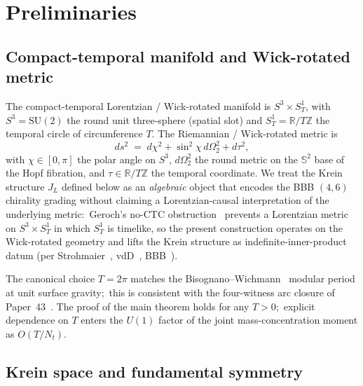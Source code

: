 \documentclass[11pt,a4paper]{article}
\theoremstyle{plain}
\theoremstyle{definition}
\newcommand{\Nt}{N_{t}}
\newcommand{\sthree}{S^{3}}
\newcommand{\SoneT}{S^{1}_{T}}
\newcommand{\Manifold}{S^{3}\times S^{1}_{T}}
\newcommand{\R}{\mathbb{R}}
\newcommand{\Z}{\mathbb{Z}}
\newcommand{\SU}{\mathrm{SU}}
\newcommand{\Uone}{U(1)}
\newcommand{\JL}{J_{L}}
\begin{document}
\section{Preliminaries}\label{sec:preliminaries}

\subsection{Compact-temporal manifold and Wick-rotated metric}
\label{sec:manifold}

The compact-temporal Lorentzian / Wick-rotated manifold is
$\Manifold$, with $\sthree = \SU(2)$ the round unit three-sphere
(spatial slot) and $\SoneT = \R / T\Z$ the temporal circle of
circumference $T$. The Riemannian / Wick-rotated metric is
\begin{equation}\label{eq:wick_metric}
   ds^{2} \;=\; d\chi^{2} + \sin^{2}\chi\, d\Omega_{2}^{2} + d\tau^{2},
\end{equation}
with $\chi \in [0, \pi]$ the polar angle on $\sthree$, $d\Omega_{2}^{2}$
the round metric on the $\mathbb{S}^{2}$ base of the Hopf fibration,
and $\tau \in \R/T\Z$ the temporal coordinate. We treat the Krein
structure $\JL$ defined below as an \emph{algebraic} object that
encodes the BBB $(4, 6)$ chirality grading without claiming a
Lorentzian-causal interpretation of the underlying metric:\ Geroch's
no-CTC obstruction~\cite{geroch1967} prevents a Lorentzian metric on
$\Manifold$ in which $\SoneT$ is timelike, so the present construction
operates on the Wick-rotated geometry and lifts the Krein structure as
indefinite-inner-product datum (per Strohmaier~\cite{strohmaier2006},
vdD~\cite{vandungen2016}, BBB~\cite{bizi_brouder_besnard2018}).

The canonical choice $T = 2\pi$ matches the
Bisognano--Wichmann~\cite{bisognano_wichmann1976} modular period at
unit surface gravity;\ this is consistent with the four-witness arc
closure of Paper~43~\cite{paper43}. The proof of the main theorem
holds for any $T > 0$;\ explicit dependence on $T$ enters the
$\Uone$ factor of the joint mass-concentration moment as $O(T/\Nt)$.

\subsection{Krein space and fundamental symmetry}\label{sec:krein_space}
\end{document}
